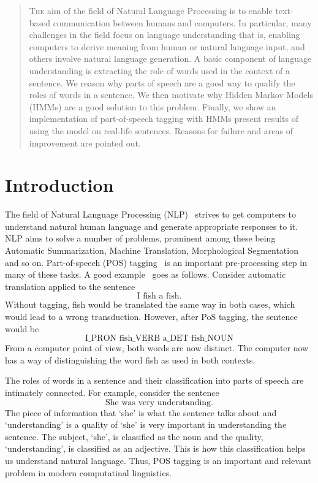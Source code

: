 \documentclass[11pt]{article}
\begin{document}
\maketitle

\begin{abstract}
\lettrine[lines=2]{T}{he} aim of the field of Natural Language Processing is to enable text-based communication between humans and computers. In particular, many challenges in the field focus on language understanding that is, enabling computers to derive meaning from human or natural language input, and others involve natural language generation. A basic component of language understanding is extracting the role of words used in the context of a sentence. We reason why parts of speech are a good way to qualify the roles of words in a sentence. We then motivate why Hidden Markov Models (HMMs) are a good solution to this problem. Finally, we show an implementation of part-of-speech tagging with HMMs present results of using the model on real-life sentences. Reasons for failure and areas of improvement are pointed out.
\end{abstract}

\section{Introduction}
The field of Natural Language Processing (NLP)~\cite{wiki:nlp} strives to get computers to understand natural human language and generate appropriate responses to it. NLP aims to solve a number of problems, prominent among these being Automatic Summarization, Machine Translation, Morphological Segmentation and so on. Part-of-speech (POS) tagging~\cite{wiki:pos} is an important pre-processing step in many of these tasks. A good example~\cite{so:uses} goes as follows. Consider automatic translation applied to the sentence
%
$$\text{I fish a fish.}$$
%
Without tagging, fish would be translated the same way in both cases, which would lead to a wrong transduction. However, after PoS tagging, the sentence would be
%
$$\text{I\_PRON fish\_VERB a\_DET fish\_NOUN}$$
%
From a computer point of view, both words are now distinct. The computer now has a way of distinguishing the word fish as used in both contexts.

The roles of words in a sentence and their classification into parts of speech are intimately connected. For example, consider the sentence
%
$$\text{She was very understanding.}$$
%
The piece of information that `she' is what the sentence talks about and `understanding' is a quality of `she' is very important in understanding the sentence. The subject, `she', is classified as the noun and the quality, `understanding', is classified as an adjective. This is how this classification helps us understand natural language. Thus, POS tagging is an important and relevant problem in modern computatinal linguistics.
\end{document}
